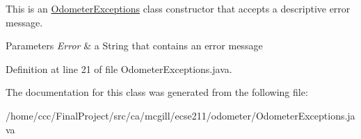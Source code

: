 This is an \hyperlink{classca_1_1mcgill_1_1ecse211_1_1odometer_1_1_odometer_exceptions}{Odometer\+Exceptions} class constructor that accepts a descriptive error message.


\begin{DoxyParams}{Parameters}
{\em Error} & a String that contains an error message \\
\hline
\end{DoxyParams}


Definition at line 21 of file Odometer\+Exceptions.\+java.



The documentation for this class was generated from the following file\+:\begin{DoxyCompactItemize}
\item 
/home/ccc/\+Final\+Project/src/ca/mcgill/ecse211/odometer/Odometer\+Exceptions.\+java\end{DoxyCompactItemize}

